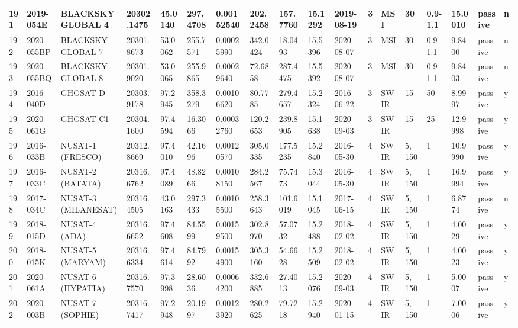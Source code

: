 \documentclass[12pt,a4paper,notitlepage,twoside,openright]{report}
\begin{document}
\begin{longtable}{|l|l|l|l|l|l|l|l|l|l|l|l|l|l|l|l|l|l|}
        191 & 2019-054E & BLACKSKY GLOBAL 4 & 20302.1475 & 45.0140 & 297.4708 & 0.00152540 & 202.2458 & 157.7760 & 15.1292 & 2019-08-19 & 3 & MSI & 30 & 0.9-1.1 & 15.0010 & passive & n \\ \hline
        192 & 2020-055BP & BLACKSKY GLOBAL 7 & 20301.8673 & 53.0062 & 255.7571 & 0.00025990 & 342.0424 & 18.0493 & 15.5396 & 2020-08-07 & 3 & MSI & 30 & 0.9-1.1 & 9.8400 & passive & n \\ \hline
        193 & 2020-055BQ & BLACKSKY GLOBAL 8 & 20301.9020 & 53.0065 & 255.9865 & 0.00029640 & 72.6858 & 287.4475 & 15.5392 & 2020-08-07 & 3 & MSI & 30 & 0.9-1.1 & 9.8403 & passive & n \\ \hline
        194 & 2016-040D & GHGSAT-D & 20303.9178 & 97.2945 & 358.3279 & 0.00106620 & 80.7785 & 279.4657 & 15.2324 & 2016-06-22 & 3 & SWIR & 15 & 50 & 8.9997 & passive & y \\ \hline
        195 & 2020-061G & GHGSAT-C1 & 20304.1600 & 97.4594 & 16.3066 & 0.00032760 & 120.2653 & 239.8905 & 15.1638 & 2020-09-03 & 3 & SWIR & 15 & 25 & 12.9998 & passive & y \\ \hline
        196 & 2016-033B & NUSAT-1 (FRESCO) & 20312.8669 & 97.4010 & 42.1696 & 0.00120570 & 305.0335 & 177.5235 & 15.2840 & 2016-05-30 & 4 & SWIR & 5, 150 & 1 & 10.9990 & passive & y \\ \hline
        197 & 2016-033C & NUSAT-2 (BATATA) & 20316.6762 & 97.4089 & 48.8266 & 0.00108150 & 284.2567 & 75.7473 & 15.3044 & 2016-05-30 & 4 & SWIR & 5, 150 & 1 & 16.9994 & passive & y \\ \hline
        198 & 2017-034C & NUSAT-3 (MILANESAT) & 20316.4505 & 43.0163 & 297.3433 & 0.00105500 & 258.3643 & 101.6019 & 15.1045 & 2017-06-15 & 4 & SWIR & 5, 150 & 1 & 6.8774 & passive & n \\ \hline
        199 & 2018-015D & NUSAT-4 (ADA) & 20316.6652 & 97.4608 & 84.5599 & 0.00159500 & 302.8970 & 57.0732 & 15.2488 & 2018-02-02 & 4 & SWIR & 5, 150 & 1 & 4.0029 & passive & y \\ \hline
        200 & 2018-015K & NUSAT-5 (MARYAM) & 20316.6334 & 97.4614 & 84.7992 & 0.00154900 & 305.3160 & 54.6628 & 15.2509 & 2018-02-02 & 4 & SWIR & 5, 150 & 1 & 4.0023 & passive & y \\ \hline
        201 & 2020-061A & NUSAT-6 (HYPATIA) & 20316.7570 & 97.3998 & 28.6036 & 0.00064200 & 332.6885 & 27.4013 & 15.2076 & 2020-09-03 & 4 & SWIR & 5, 150 & 1 & 5.0007 & passive & y \\ \hline
        202 & 2020-003B & NUSAT-7 (SOPHIE) & 20316.7417 & 97.2948 & 20.1997 & 0.00123920 & 280.2625 & 79.7218 & 15.2940 & 2020-01-15 & 4 & SWIR & 5, 150 & 1 & 7.0006 & passive & y \\ \hline

\end{longtable}
\end{document}
